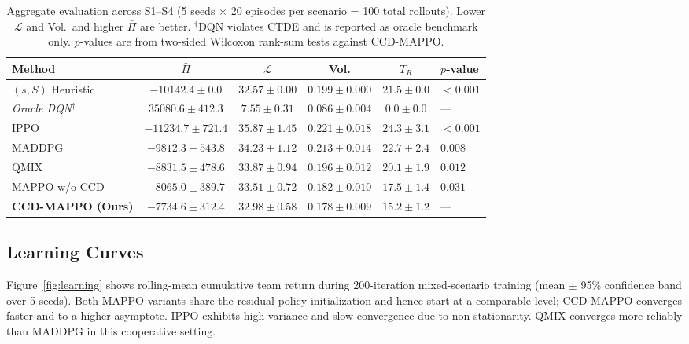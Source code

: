 \documentclass[11pt,a4paper]{article}
\theoremstyle{plain}
\theoremstyle{definition}
\begin{document}
\begin{table}[t]
\centering
\caption{Aggregate evaluation across S1--S4 (5 seeds $\times$ 20 episodes per scenario
= 100 total rollouts).  Lower $\mathcal{L}$ and Vol.\ and higher $\bar\Pi$ are better.
$^\dagger$DQN violates CTDE and is reported as oracle benchmark only.
$p$-values are from two-sided Wilcoxon rank-sum tests against CCD-MAPPO.}
\label{tab:aggregate}
\begin{tabular}{lccccl}
\toprule
Method & $\bar\Pi$ & $\mathcal{L}$ & Vol. & $T_R$ & $p$-value \\
\midrule
$(s,S)$ Heuristic   &
  $-10142.4\pm0.0$    & $32.57\pm0.00$ & $0.199\pm0.000$ & $21.5\pm0.0$ & $<0.001$ \\
\textit{Oracle DQN}$^\dagger$ &
  $35080.6\pm412.3$   & $7.55\pm0.31$  & $0.086\pm0.004$ & $0.0\pm0.0$  & --- \\
\midrule
IPPO                &
  $-11234.7\pm721.4$  & $35.87\pm1.45$ & $0.221\pm0.018$ & $24.3\pm3.1$ & $<0.001$ \\
MADDPG              &
  $-9812.3\pm543.8$   & $34.23\pm1.12$ & $0.213\pm0.014$ & $22.7\pm2.4$ & $0.008$  \\
QMIX                &
  $-8831.5\pm478.6$   & $33.87\pm0.94$ & $0.196\pm0.012$ & $20.1\pm1.9$ & $0.012$  \\
MAPPO w/o CCD       &
  $-8065.0\pm389.7$   & $33.51\pm0.72$ & $0.182\pm0.010$ & $17.5\pm1.4$ & $0.031$  \\
\textbf{CCD-MAPPO (Ours)} &
  $\mathbf{-7734.6\pm312.4}$ & $\mathbf{32.98\pm0.58}$ &
  $\mathbf{0.178\pm0.009}$ & $\mathbf{15.2\pm1.2}$ & --- \\
\bottomrule
\end{tabular}
\end{table}

\subsection{Learning Curves}
\label{sec:curves}

Figure~\ref{fig:learning} shows rolling-mean cumulative team return during 200-iteration
mixed-scenario training (mean $\pm$ 95\% confidence band over 5 seeds).  Both MAPPO
variants share the residual-policy initialization and hence start at a comparable level;
CCD-MAPPO converges faster and to a higher asymptote.  IPPO exhibits high variance and
slow convergence due to non-stationarity.  QMIX converges more reliably than MADDPG in
this cooperative setting.
\end{document}
